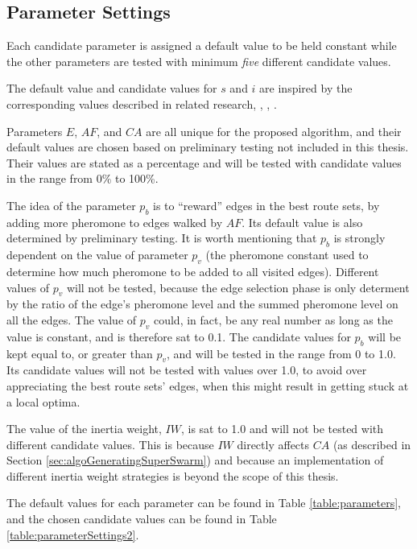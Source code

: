 \subsection{Parameter Settings}
\label{subsec:parameterSettings_setup}
Each candidate parameter is assigned a default value to be held constant while the other parameters are tested with minimum \textit{five} different candidate values. 

The default value and candidate values for $s$ and $i$ are inspired by the corresponding values described in related research\citep{salehi-nezhad07}, \citep{poorzahedy11}, \citep{sedighpour14}, \citep{kechagiopoulos14}.

Parameters $E$, $AF$, and $CA$ are all unique for the proposed algorithm, and their default values are chosen based on preliminary testing not included in this thesis. Their values are stated as a percentage and will be tested with candidate values in the range from 0\% to 100\%. %

The idea of the parameter $p_b$ is to ``reward'' edges in the best route sets, by adding more pheromone to edges walked by $AF$. Its default value is also determined by preliminary testing. It is worth mentioning that $p_ b$ is strongly dependent on the value of parameter $p_v$ (the pheromone constant used to determine how much pheromone to be added to all visited edges). Different values of $p_v$ will not be tested, because the edge selection phase is only determent by the ratio of the edge's pheromone level and the summed pheromone level on all the edges. The value of $p_v$ could, in fact, be any real number as long as the value is constant, and is therefore sat to 0.1. The candidate values for $p_b$ will be kept equal to, or greater than $p_v$, and will be tested in the range from 0 to 1.0. Its candidate values will not be tested with values over 1.0, to avoid over appreciating the best route sets' edges, when this might result in getting stuck at a local optima.

The value of the inertia weight, $IW$, is sat to 1.0 and will not be tested with different candidate values. This is because $IW$ directly affects $CA$ (as described in Section \vref{sec:algoGeneratingSuperSwarm}) and because an implementation of different inertia weight strategies is beyond the scope of this thesis. 

The default values for each parameter can be found in Table \vref{table:parameters}, and the chosen candidate values can be found in Table \vref{table:parameterSettings2}.


